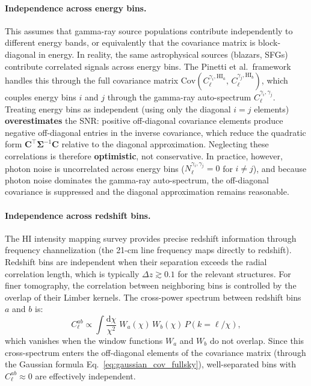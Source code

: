 \documentclass[10pt,a4paper]{article}
\newcommand{\Cl}{C_\ell}
\begin{document}
\paragraph{Independence across energy bins.}
This assumes that gamma-ray source populations contribute independently to different energy bands, or equivalently that the covariance matrix is block-diagonal in energy. In reality, the same astrophysical sources (blazars, SFGs) contribute correlated signals across energy bins. The Pinetti et al.\ framework handles this through the full covariance matrix $\mathrm{Cov}(\Cl^{\gamma_i,\mathrm{HI}_a},\, \Cl^{\gamma_j,\mathrm{HI}_b})$, which couples energy bins $i$ and $j$ through the gamma-ray auto-spectrum $\Cl^{\gamma_i,\gamma_j}$. Treating energy bins as independent (using only the diagonal $i=j$ elements) \textbf{overestimates} the SNR: positive off-diagonal covariance elements produce negative off-diagonal entries in the inverse covariance, which reduce the quadratic form $\mathbf{C}^\top \bm{\Sigma}^{-1}\mathbf{C}$ relative to the diagonal approximation. Neglecting these correlations is therefore \textbf{optimistic}, not conservative. In practice, however, photon noise is uncorrelated across energy bins ($N_\ell^{\gamma_i,\gamma_j} = 0$ for $i \neq j$), and because photon noise dominates the gamma-ray auto-spectrum, the off-diagonal covariance is suppressed and the diagonal approximation remains reasonable.

\paragraph{Independence across redshift bins.}
The HI intensity mapping survey provides precise redshift information through frequency channelization (the 21-cm line frequency maps directly to redshift). Redshift bins are independent when their separation exceeds the radial correlation length, which is typically $\Delta z \gtrsim 0.1$ for the relevant structures. For finer tomography, the correlation between neighboring bins is controlled by the overlap of their Limber kernels. The cross-power spectrum between redshift bins $a$ and $b$ is:
\begin{equation}
C_\ell^{ab} \propto
\int \frac{\mathrm{d}\chi}{\chi^2}\;
W_a(\chi)\, W_b(\chi)\, P(k{=}\ell/\chi),
\end{equation}
which vanishes when the window functions $W_a$ and $W_b$ do not overlap. Since this cross-spectrum enters the off-diagonal elements of the covariance matrix (through the Gaussian formula Eq.~\ref{eq:gaussian_cov_fullsky}), well-separated bins with $C_\ell^{ab} \approx 0$ are effectively independent.
\end{document}
